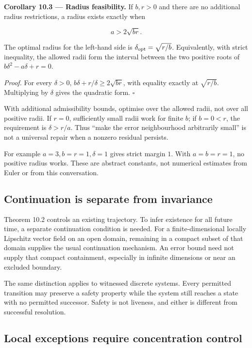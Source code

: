 \documentclass[11pt,a4paper]{article}
\begin{document}

\textbf{Corollary 10.3 --- Radius feasibility.} If \(b,r>0\) and there
are no additional radius restrictions, a radius exists exactly when

\nopagebreak[4]

\[a>2\sqrt{br}.\]

The optimal radius for the left-hand side is
\(\delta_{\rm opt}=\sqrt{r/b}\). Equivalently, with strict inequality,
the allowed radii form the interval between the two positive roots of
\(b\delta^2-a\delta+r=0\).

\emph{Proof.} For every \(\delta>0\),
\(b\delta+r/\delta\geq2\sqrt{br}\), with equality exactly at
\(\sqrt{r/b}\). Multiplying by \(\delta\) gives the quadratic form.
\(\square\)

With additional admissibility bounds, optimise over the allowed radii,
not over all positive radii. If \(r=0\), sufficiently small radii work
for finite \(b\); if \(b=0<r\), the requirement is \(\delta>r/a\). Thus
``make the error neighbourhood arbitrarily small'' is not a universal
repair when a nonzero residual persists.

For example \(a=3,b=r=1,\delta=1\) gives strict margin \(1\). With
\(a=b=r=1\), no positive radius works. These are abstract constants, not
numerical estimates from Euler or from this conversation.

\subsection{Continuation is separate from
invariance}\label{continuation-is-separate-from-invariance}


Theorem 10.2 controls an existing trajectory. To infer existence for all
future time, a separate continuation condition is needed. For a
finite-dimensional locally Lipschitz vector field on an open domain,
remaining in a compact subset of that domain supplies the usual
continuation mechanism. An error bound need not supply that compact
containment, especially in infinite dimensions or near an excluded
boundary.

The same distinction applies to witnessed discrete systems. Every
permitted transition may preserve a safety property while the system
still reaches a state with no permitted successor. Safety is not
liveness, and either is different from successful resolution.

\subsection{Local exceptions require concentration
control}\label{local-exceptions-require-concentration-control}
\end{document}
